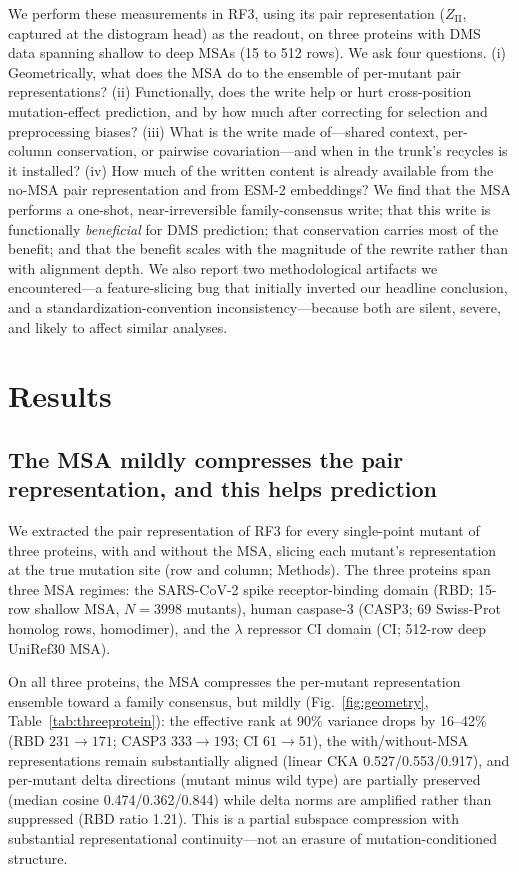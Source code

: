 \documentclass[11pt]{article}
\begin{document}
We perform these measurements in RF3, using its pair representation
($Z_{\mathrm{II}}$, captured at the distogram head) as the readout, on three
proteins with DMS data spanning shallow to deep MSAs (15 to 512 rows). We ask
four questions. (i) Geometrically, what does the MSA do to the ensemble of
per-mutant pair representations? (ii) Functionally, does the write help or
hurt cross-position mutation-effect prediction, and by how much after
correcting for selection and preprocessing biases? (iii) What is the write
made of---shared context, per-column conservation, or pairwise
covariation---and when in the trunk's recycles is it installed? (iv) How much
of the written content is already available from the no-MSA pair
representation and from ESM-2 embeddings? We find that the MSA performs a
one-shot, near-irreversible family-consensus write; that this write is
functionally \emph{beneficial} for DMS prediction; that conservation carries
most of the benefit; and that the benefit scales with the magnitude of the
rewrite rather than with alignment depth. We also report two methodological
artifacts we encountered---a feature-slicing bug that initially inverted our
headline conclusion, and a standardization-convention inconsistency---because
both are silent, severe, and likely to affect similar analyses.

\section{Results}

\subsection{The MSA mildly compresses the pair representation, and this helps prediction}
\label{sec:threeprotein}

We extracted the pair representation of RF3 for every single-point mutant of
three proteins, with and without the MSA, slicing each mutant's representation
at the true mutation site (row and column; Methods). The three proteins span
three MSA regimes: the SARS-CoV-2 spike receptor-binding domain (RBD; 15-row
shallow MSA, $N{=}3998$ mutants), human caspase-3 (CASP3; 69 Swiss-Prot
homolog rows, homodimer), and the $\lambda$ repressor CI domain (CI; 512-row
deep UniRef30 MSA).

On all three proteins, the MSA compresses the per-mutant representation
ensemble toward a family consensus, but mildly (Fig.~\ref{fig:geometry},
Table~\ref{tab:threeprotein}): the effective rank at 90\% variance drops by
16--42\% (RBD $231{\to}171$; CASP3 $333{\to}193$; CI $61{\to}51$), the
with/without-MSA representations remain substantially aligned (linear CKA
0.527/0.553/0.917), and per-mutant delta directions (mutant minus wild type)
are partially preserved (median cosine 0.474/0.362/0.844) while delta norms
are amplified rather than suppressed (RBD ratio 1.21). This is a partial
subspace compression with substantial representational continuity---not an
erasure of mutation-conditioned structure.
\end{document}
